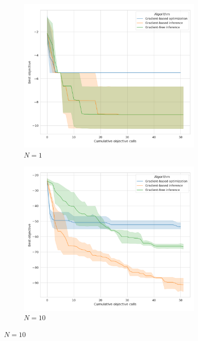 \begin{figure}[tb]
    \centering
    \begin{subfigure}[t]{0.24\linewidth}
        \centering
        \includegraphics[width=\linewidth]{images/global_methods/ballistic_1.png}
        \caption{$N=1$}
    \end{subfigure}
    \begin{subfigure}[t]{0.24\linewidth}
        \centering
        \includegraphics[width=\linewidth]{images/global_methods/ballistic_10.png}
        \caption{$N=10$}

\end{subfigure}
\end{figure}
